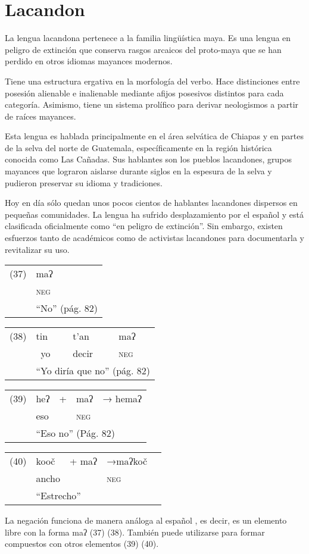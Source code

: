 \section*{Lacandon}

\noindent La lengua lacandona pertenece a la familia lingüística maya. Es una lengua en peligro de extinción que conserva rasgos arcaicos del proto-maya que se han perdido en otros idiomas mayances modernos.

 Tiene una estructura ergativa en la morfología del verbo. Hace distinciones entre posesión alienable e inalienable mediante afijos posesivos distintos para cada categoría. Asimismo, tiene un sistema prolífico para derivar neologismos a partir de raíces mayances.

Esta lengua es hablada principalmente en el área selvática de Chiapas y en partes de la selva del norte de Guatemala, específicamente en la región histórica conocida como Las Cañadas. Sus hablantes son los pueblos lacandones, grupos mayances que lograron aislarse durante siglos en la espesura de la selva y pudieron preservar su idioma y tradiciones.

Hoy en día sólo quedan unos pocos cientos de hablantes lacandones dispersos en pequeñas comunidades. La lengua ha sufrido desplazamiento por el español y está clasificada oficialmente como “en peligro de extinción”. Sin embargo, existen esfuerzos tanto de académicos como de activistas lacandones para documentarla y revitalizar su uso. \vspace{0.5cm}

{\setmainfont{Doulos SIL} 
\begin{tabular}{ll}
(37) & maʔ  \\
& \textsc{neg} \\
& ``No'' (pág. 82)
\end{tabular} \vspace{0.5cm}

\begin{tabular}{llll}
(38) & tin & t'an & maʔ \\
& \ yo & decir & \textsc{neg} \\
& \multicolumn{3}{l}{``Yo diría que no'' (pág. 82)}
\end{tabular} \vspace{0.5cm}

\begin{tabular}{lllll}
(39) & heʔ & + & maʔ & → hemaʔ \\
& eso & & \textsc{neg} & \\
& \multicolumn{4}{l}{``Eso no'' (Pág. 82)}
\end{tabular} \vspace{0.5cm}

\begin{tabular}{lllll}
(40) & kooč & + maʔ & →maʔkoč \\
& ancho &  & \textsc{neg} & \\
& \multicolumn{4}{l}{``Estrecho''}
\end{tabular} \vspace{0.5cm}
}

La negación funciona de manera análoga al español \textcolor{MidnightBlue}{\citep{lacandon}}, es decir, es un elemento libre con la forma {\setmainfont{Doulos SIL} maʔ} (37) (38). También puede utilizarse para formar compuestos con otros elementos (39) (40).